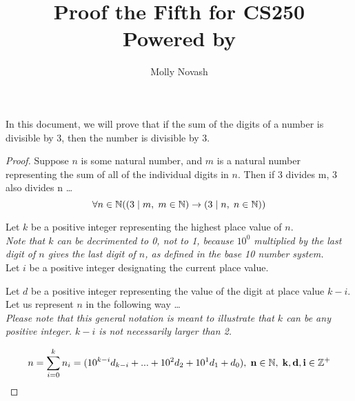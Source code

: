 \documentclass[12pt]{article}
\author{Molly Novash}
\title{%
\Huge Proof the Fifth for CS250  \\
\normalsize Powered by \LaTeXe}
\begin{document}
\sloppy
\maketitle
\bigskip

In this document, we will prove that if the sum of the digits of a number is divisible by 3, then the number is divisible by 3.

\begin{proof}
\bigskip
\par
Suppose $n$ is some natural number, and $m$ is a natural number representing the sum of all of the individual digits in $n$. Then if 3 divides m, 3 also divides n \ldots\\

\begin{equation}
\forall n \in \mathbb{N}((3 \hspace{.1cm} | \hspace{.1cm} m , \hspace{.1cm} m \in \mathbb{N}) \rightarrow (3 \hspace{.1cm} | \hspace{.1cm} n , \hspace{.1cm} n \in \mathbb{N}))
\end{equation}

\bigskip
\par

Let $k$ be a positive integer representing the highest place value of $n$. \\

\noindent\textit{Note that $k$ can be decrimented to 0, not to 1, because $10^0$ multiplied by the last digit of $n$ gives the last digit of $n$, as defined in the base 10 number system.}\\

Let $i$ be a positive integer designating the current place value. 

Let $d$ be a positive integer representing the value of the digit at place value $k - i$. \\

Let us represent $n$ in the following way \ldots \\

\noindent\textit{Please note that this general notation is meant to illustrate that $k$ can be any positive integer. $k - i$ is not necessarily larger than 2.}

\begin{equation}
n = \sum_{i = 0}^{k} n_{i} = (10^{k - i} d_{k - i} + ... + 10^2 d_{2} + 10^1 d_{1} + d_{0}) , \hspace{.1cm}\textbf{n} \in \mathbb{N}, \hspace{.1cm}\textbf{k},\textbf{d},\textbf{i} \in \mathbb{Z^+}
\end{equation}


\end{proof}
\end{document}
